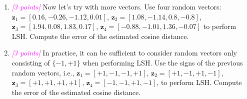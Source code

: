 \documentclass{exam}
\newcommand{\zv}{\mathbf{z}}
\newcommand{\grade}[1]{\small\textcolor{magenta}{\emph{[#1 points]}} \normalsize}
\begin{document}
\begin{enumerate}[label=(\alph*)]
\begin{enumerate}[label=\roman*.]
        \vspace{8em}
        \item \grade{3} Now let's try with more vectors. Use four random vectors: $\zv_1 = [0.16, -0.26, -1.12, 0.01]$, $\zv_2=[1.08,-1.14,0.8,-0.8]$, $\zv_3 = [1.94, 0.08, 1.83, 0.17]$, $\zv_4=[-0.88, -1.01, 1.36, -0.07]$ to perform LSH. Compute the error of the estimated cosine distance.
        
        \vspace{8em}
        \item \grade{3} In practice, it can be sufficient to consider random vectors only consisting of $\{-1,+1\}$ when performing LSH. Use the signs of the previous random vectors, i.e., $\zv_1 = [+1, -1, -1, +1]$, $\zv_2=[+1,-1,+1,-1]$, $\zv_3 = [+1,+1,+1,+1]$, $\zv_4=[-1,-1,+1,-1]$, to perform LSH. Compute the error of the estimated cosine distance.
        
    \end{enumerate}
\end{enumerate}
\end{document}
